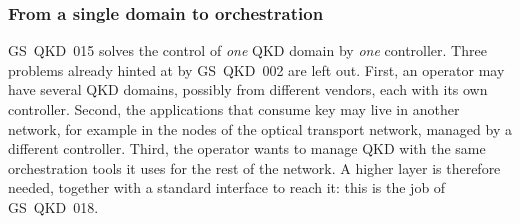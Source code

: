 \subsubsection{From a single domain to orchestration}

GS~QKD~015 solves the control of \emph{one} QKD domain by \emph{one}
controller. Three problems already hinted at by GS~QKD~002 are left out.
First, an operator may have several QKD domains, possibly from different
vendors, each with its own controller. Second, the applications that
consume key may live in another network, for example in the nodes of the
optical transport network, managed by a different controller. Third, the
operator wants to manage QKD with the same orchestration tools it uses for
the rest of the network. A higher layer is therefore needed, together with
a standard interface to reach it: this is the job of GS~QKD~018.
